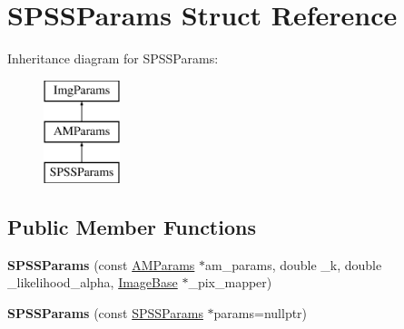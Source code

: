 \hypertarget{structSPSSParams}{\section{S\-P\-S\-S\-Params Struct Reference}
\label{structSPSSParams}
}
Inheritance diagram for S\-P\-S\-S\-Params\-:\begin{figure}[H]
\begin{center}
\leavevmode
\includegraphics[height=3.000000cm]{structSPSSParams}
\end{center}
\end{figure}
\subsection*{Public Member Functions}
\begin{DoxyCompactItemize}
\item 
\hypertarget{structSPSSParams_a78cc38c732c2ea7e6016f1c120546e0c}{{\bfseries S\-P\-S\-S\-Params} (const \hyperlink{structAMParams}{A\-M\-Params} $\ast$am\-\_\-params, double \-\_\-k, double \-\_\-likelihood\-\_\-alpha, \hyperlink{classImageBase}{Image\-Base} $\ast$\-\_\-pix\-\_\-mapper)}\label{structSPSSParams_a78cc38c732c2ea7e6016f1c120546e0c}

\item 
\hypertarget{structSPSSParams_a63128a4178b98cb6ea591eaa3035fb45}{{\bfseries S\-P\-S\-S\-Params} (const \hyperlink{structSPSSParams}{S\-P\-S\-S\-Params} $\ast$params=nullptr)}\label{structSPSSParams_a63128a4178b98cb6ea591eaa3035fb45}

\end{DoxyCompactItemize}
